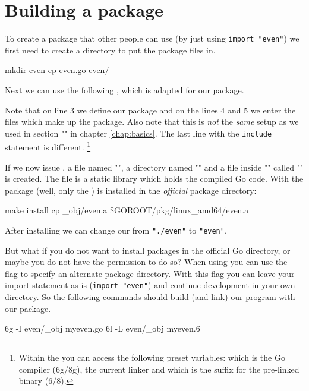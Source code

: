 \section{Building a package}
\label{sec:building a package}
To create a package that other people can use (by just using
\lstinline{import "even"}) we first need to create a directory
to put the package files in. 
\begin{display}
\pr mkdir even
\pr cp even.go even/
\end{display}
\noindent{}Next we 
can use the following 
, which 
is adapted for our  package.

Note that on line 3 we define our  package and on the
lines 4 and 5 we enter the files which make up the package.
Also note that this is \emph{not} the \emph{same}  setup as we used
in section "" in chapter
\ref{chap:basics}. The last line with the \verb|include| statement is
different.
\footnote{Within the  you can access the following
preset variables:  which is the Go compiler (6g/8g),
 the current linker and  which is the suffix
for the pre-linked binary (6/8).}

If we now issue , a file named "", a directory
named "" and a file inside "" called
""
is created. The file  is a static library which holds
the compiled Go code.
With  the package (well, only the ) is installed in the \emph{official}
package directory:
\begin{display}
\pr make install
cp \_obj/even.a \$GOROOT/pkg/linux\_amd64/even.a
\end{display}
\noindent{}After installing we can change our  from
\lstinline{"./even"} to \lstinline{"even"}.

But what if you do not want to install packages in the official Go
directory, or maybe you do not have the permission to do so? When using
 you can use the -flag to specify an alternate
package directory. With this flag you can leave your import statement
as-is (\lstinline{import "even"}) and continue development in your
own directory. So the following commands should build (and link) our
 program with our package.
\begin{display}
\pr 6g -I even/\_obj myeven.go	
\pr 6l -L even/\_obj myeven.6	
\end{display}

